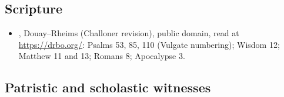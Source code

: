\subsection*{Scripture}

\begin{itemize}
\item {}, Douay--Rheims (Challoner revision), public domain,
  read at \url{https://drbo.org/}: Psalms 53, 85, 110 (Vulgate numbering);
  Wisdom 12; Matthew 11 and 13; Romans 8; Apocalypse 3.
\end{itemize}

\subsection*{Patristic and scholastic witnesses}

